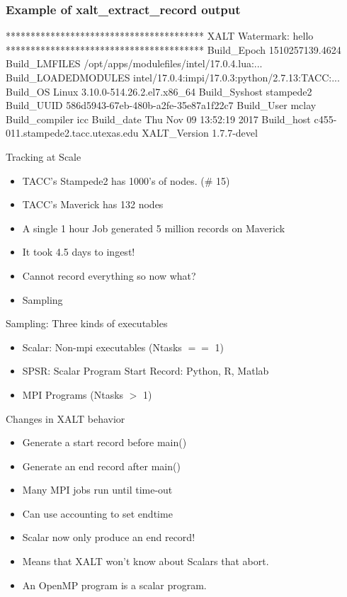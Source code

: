 \documentclass{beamer}
\begin{document}
\begin{frame}[fragile]
    \frametitle{Example of xalt\_extract\_record output}
 {\tiny
    \begin{semiverbatim}
****************************************
XALT Watermark: hello
****************************************
Build_Epoch              1510257139.4624
Build_LMFILES            /opt/apps/modulefiles/intel/17.0.4.lua:...
Build_LOADEDMODULES      intel/17.0.4:impi/17.0.3:python/2.7.13:TACC:...
Build_OS                 Linux 3.10.0-514.26.2.el7.x86_64
Build_Syshost            stampede2
Build_UUID               586d5943-67eb-480b-a2fe-35e87a1f22c7
Build_User               mclay
Build_compiler           icc
Build_date               Thu Nov 09 13:52:19 2017
Build_host               c455-011.stampede2.tacc.utexas.edu
XALT_Version             1.7.7-devel
    \end{semiverbatim}
}
\end{frame}


\begin{frame}{Tracking at Scale}
  \begin{itemize}
    \item TACC's Stampede2 has 1000's of nodes. (\# 15)
    \item TACC's Maverick has 132 nodes
    \item A single 1 hour Job generated 5 million records on Maverick
    \item It took 4.5 days to ingest!
    \item Cannot record everything so now what?
    \item Sampling
  \end{itemize}
\end{frame}


\begin{frame}{Sampling: Three kinds of executables}
  \begin{itemize}
    \item Scalar: Non-mpi executables (Ntasks $==$ 1)
    \item SPSR: Scalar Program Start Record: Python, R, Matlab
    \item MPI Programs (Ntasks $>$ 1)
  \end{itemize}
\end{frame}

\begin{frame}{Changes in XALT behavior}
  \begin{itemize}
    \item Generate a start record before main()
    \item Generate an end record after main()
    \item Many MPI jobs run until time-out
    \item Can use accounting to set endtime
    \item Scalar now only produce an end record!
    \item Means that XALT won't know about Scalars that abort.
    \item An OpenMP program is a scalar program.
  \end{itemize}
\end{frame}
\end{document}
